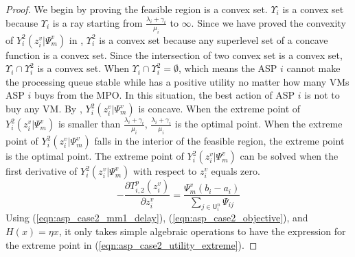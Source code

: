 \documentclass[conference]{IEEEtran}
\begin{document}
\begin{proof}
We begin by proving the feasible region is a convex set. $\Upsilon_i$ is a convex set because $\Upsilon_i$ is a ray starting from $\frac{\lambda_i+\gamma_i}{\mu_i}$ to $\infty$. Since we have proved the convexity of $Y_i^2(z_i^v|\Psi_m^v)$ in , $\Upsilon_i^2$ is a convex set because any superlevel set of a concave function is a convex set. Since the intersection of two convex set is a convex set, $\Upsilon_i \cap \Upsilon_i^2$ is a convex set. When $\Upsilon_i \cap \Upsilon_i^2 = \emptyset$, which means the ASP $i$ cannot make the processing queue stable while has a positive utility no matter how many VMs ASP $i$ buys from the MPO. In this situation, the best action of ASP $i$ is not to buy any VM. By , $Y_i^2(z_i^v|\Psi_m^v)$ is concave. When the extreme point of $Y_i^2(z_i^v|\Psi_m^v)$ is smaller than $\frac{\lambda_i+\gamma_i}{\mu_i}$, $\frac{\lambda_i+\gamma_i}{\mu_i}$ is the optimal point. When the extreme point of $Y_i^2(z_i^v|\Psi_m^v)$ falls in the interior of the feasible region, the extreme point is the optimal point. The extreme point of $Y_i^2(z_i^v|\Psi_m^v)$ can be solved when the first derivative of $Y_i^2(z_i^v|\Psi_m^v)$ with respect to $z_i^v$ equals zero.
\begin{equation} \label{eqn:asp_case2_utility_first_deriv}
-\frac{\partial T_{i,2}^p(z_i^v)}{\partial z_i^v} = \frac{\Psi_m^v (b_i - a_i)}{\sum_{j \in \mathsf{U}_i^n} \Psi_{ij}}
\end{equation}
Using (\ref{eqn:asp_case2_mm1_delay}), (\ref{eqn:asp_case2_objective}), and $H(x)=\eta x$, it only takes simple algebraic operations to have the expression for the extreme point in (\ref{eqn:asp_case2_utility_extreme}). \qedhere
\end{proof}
\end{document}
